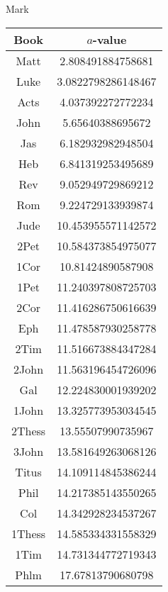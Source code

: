 \documentclass[12pt,letterpaper]{article}
\begin{document}
Mark
\begin{longtable}{|c|c|}
\hline
 Book & $a$-value \\ \hline
Matt & 2.808491884758681 \\ \hline
 Luke & 3.0822798286148467 \\ \hline
 Acts & 4.037392272772234 \\ \hline
 John & 5.65640388695672 \\ \hline
 Jas & 6.182932982948504 \\ \hline
 Heb & 6.841319253495689 \\ \hline
 Rev & 9.052949729869212 \\ \hline
 Rom & 9.224729133939874 \\ \hline
 Jude & 10.453955571142572 \\ \hline
 2Pet & 10.584373854975077 \\ \hline
 1Cor & 10.81424890587908 \\ \hline
 1Pet & 11.240397808725703 \\ \hline
 2Cor & 11.416286750616639 \\ \hline
 Eph & 11.478587930258778 \\ \hline
 2Tim & 11.516673884347284 \\ \hline
 2John & 11.563196454726096 \\ \hline
 Gal & 12.224830001939202 \\ \hline
 1John & 13.325773953034545 \\ \hline
 2Thess & 13.55507990735967 \\ \hline
 3John & 13.581649263068126 \\ \hline
 Titus & 14.109114845386244 \\ \hline
 Phil & 14.217385143550265 \\ \hline
 Col & 14.342928234537267 \\ \hline
 1Thess & 14.585334331558329 \\ \hline
 1Tim & 14.731344772719343 \\ \hline
 Phlm & 17.67813790680798 \\ \hline 
\end{longtable}
\end{document}
